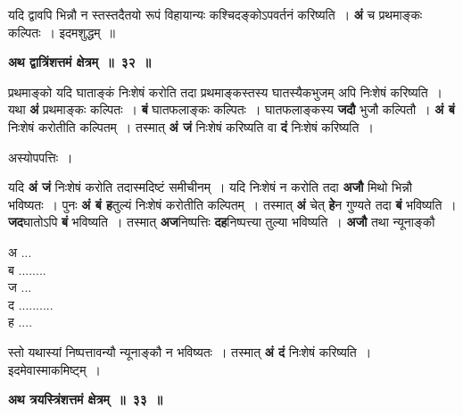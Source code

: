 \documentclass[11pt, openany]{book}
\begin{document}
 यदि द्वावपि भिन्नौ न स्तस्तदैतयो रूपं विहायान्यः कश्चिदङ्कोऽपवर्तनं करिष्यति~। \textbf{अं} च प्रथमाङ्कः कल्पितः~। इदमशुद्धम्~॥ 
\vspace{2mm}

\begin{center}
\textbf{\large अथ द्वात्रिंशत्तमं क्षेत्रम्~॥~३२~॥}
\end{center}

{\ab प्रथमाङ्को यदि घाताङ्कं निःशेषं करोति तदा प्रथमाङ्कस्तस्य घातस्यैकभुजम् अपि निःशेषं करिष्यति~। }\\

 यथा \textbf{अं} प्रथमाङ्कः कल्पितः~। \textbf{बं} घातफलाङ्कः कल्पितः~। घातफलाङ्कस्य \textbf{जदौ} भुजौ कल्पितौ~। \textbf{अं बं} निःशेषं करोतीति कल्पितम्~। तस्मात् \textbf{अं जं} निःशेषं करिष्यति वा \textbf{दं} निःशेषं करिष्यति~। 
 
\begin{center}
अस्योपपत्तिः~।
\end{center}

\begin{flushleft}
\begin{minipage}[t]{0.75\textwidth}
\hspace{4mm} यदि \textbf{अं जं} निःशेषं करोति तदास्मदिष्टं समीचीनम्~। यदि निःशेषं न करोति तदा \textbf{अजौ} मिथो भिन्नौ भविष्यतः~। पुनः \textbf{अं बं ह}तुल्यं निःशेषं करोतीति कल्पितम्~। तस्मात् \textbf{अं} चेत् \textbf{हे}न गुण्यते तदा \textbf{बं} भविष्यति~। \textbf{जद}घातोऽपि \textbf{बं} भविष्यति~। तस्मात् \textbf{अज}निष्पत्तिः \textbf{दह}निष्पत्त्या तुल्या भविष्यति~। \textbf{अजौ} तथा न्यूनाङ्कौ
\end{minipage} 
\hfill
\begin{minipage}[t]{0.15\textwidth}
अ ...\\
ब ........ \\
ज ... \\
द ..........\\
ह ....
\end{minipage}
\end{flushleft}
\vspace{-3mm}

\noindent स्तो यथास्यां निष्पत्तावन्यौ न्यूनाङ्कौ न भविष्यतः~। तस्मात् \textbf{अं दं} निःशेषं करिष्यति~। इदमेवास्माकमिष्ट्म्~।
 
\begin{center}
\textbf{\large अथ त्रयस्त्रिंशत्तमं क्षेत्रम्~॥~३३~॥}
\end{center}
\vspace{2mm}
\end{document}
